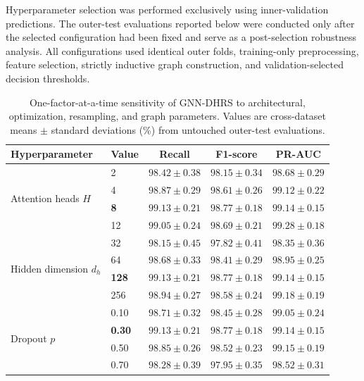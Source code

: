 \documentclass[pdflatex,sn-mathphys-num]{sn-jnl}%
\theoremstyle{thmstyleone}%
\theoremstyle{thmstyletwo}%
\theoremstyle{thmstylethree}%
\begin{document}
 {
Hyperparameter selection was performed exclusively using inner-validation
predictions. The outer-test evaluations reported below were conducted only
after the selected configuration had been fixed and serve as a post-selection
robustness analysis. All configurations used identical outer folds,
training-only preprocessing, feature selection, strictly inductive graph
construction, and validation-selected decision thresholds.
}

\begingroup
 
\begin{table}[!ht]
\centering
\caption{
One-factor-at-a-time sensitivity of GNN-DHRS to architectural, optimization,
resampling, and graph parameters. Values are cross-dataset means
\(\pm\) standard deviations (\%) from untouched outer-test evaluations.
}
\label{tab:hyperparameter_sensitivity}
\scriptsize
\setlength{\tabcolsep}{4.2pt}
\renewcommand{\arraystretch}{1.03}
\begin{tabular}{@{}llccc@{}}
\toprule
\textbf{Hyperparameter} &
\textbf{Value} &
\textbf{Recall} &
\textbf{F1-score} &
\textbf{PR-AUC} \\
\midrule

\multirow{4}{*}{Attention heads \(H\)}
& 2
& $98.42\pm0.38$ & $98.15\pm0.34$ & $98.68\pm0.29$ \\
& 4
& $98.87\pm0.29$ & $98.61\pm0.26$ & $99.12\pm0.22$ \\
& \textbf{8}
& \textbf{$99.13\pm0.21$}
& \textbf{$98.77\pm0.18$}
& \textbf{$99.14\pm0.15$} \\
& 12
& $99.05\pm0.24$ & $98.69\pm0.21$ & $99.28\pm0.18$ \\
\midrule

\multirow{4}{*}{Hidden dimension \(d_h\)}
& 32
& $98.15\pm0.45$ & $97.82\pm0.41$ & $98.35\pm0.36$ \\
& 64
& $98.68\pm0.33$ & $98.41\pm0.29$ & $98.95\pm0.25$ \\
& \textbf{128}
& \textbf{$99.13\pm0.21$}
& \textbf{$98.77\pm0.18$}
& \textbf{$99.14\pm0.15$} \\
& 256
& $98.94\pm0.27$ & $98.58\pm0.24$ & $99.18\pm0.19$ \\
\midrule

\multirow{4}{*}{Dropout \(p\)}
& 0.10
& $98.71\pm0.32$ & $98.45\pm0.28$ & $99.05\pm0.24$ \\
& \textbf{0.30}
& \textbf{$99.13\pm0.21$}
& \textbf{$98.77\pm0.18$}
& \textbf{$99.14\pm0.15$} \\
& 0.50
& $98.85\pm0.26$ & $98.52\pm0.23$ & $99.15\pm0.19$ \\
& 0.70
& $98.28\pm0.39$ & $97.95\pm0.35$ & $98.52\pm0.31$ \\
\midrule


\end{tabular}
\end{table}
\end{document}
